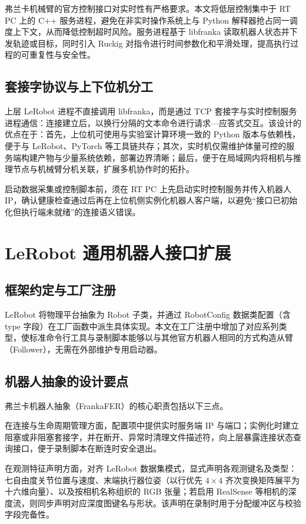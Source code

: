 弗兰卡机械臂的官方控制接口对实时性有严格要求。本文将低层控制集中于 RT PC 上的 C++ 服务进程，避免在非实时操作系统上与 Python 解释器抢占同一调度上下文，从而降低控制超时风险。服务进程基于 libfranka 读取机器人状态并下发轨迹或目标，同时引入 Ruckig 对指令进行时间参数化和平滑处理，提高执行过程的可重复性与安全性。

\subsection{套接字协议与上下位机分工}

上层 LeRobot 进程不直接调用 libfranka，而是通过 TCP 套接字与实时控制服务进程通信：连接建立后，以换行分隔的文本命令进行请求—应答式交互。该设计的优点在于：首先，上位机可使用与实验室计算环境一致的 Python 版本与依赖栈，便于与 LeRobot、PyTorch 等工具链共存；其次，实时机仅需维护体量可控的服务端构建产物与少量系统依赖，部署边界清晰；最后，便于在局域网内将相机与推理节点与机械臂分机关联，扩展多机协作时的拓扑。

启动数据采集或控制脚本前，须在 RT PC 上先启动实时控制服务并传入机器人 IP，确认健康检查通过后再在上位机侧实例化机器人客户端，以避免“接口已初始化但执行端未就绪”的连接语义错误。

\section{LeRobot 通用机器人接口扩展}
\label{sec:lerobot-robot}

\subsection{框架约定与工厂注册}

LeRobot 将物理平台抽象为 Robot 子类，并通过 RobotConfig 数据类配置（含 type 字段）在工厂函数中派生具体实现。本文在工厂注册中增加了对应系列类型，使标准命令行工具与录制脚本能够以与其他官方机器人相同的方式构造从臂（Follower），无需在外部维护专用启动器。

\subsection{机器人抽象的设计要点}

弗兰卡机器人抽象（FrankaFER）的核心职责包括以下三点。

在连接与生命周期管理方面，配置项中提供实时服务端 IP 与端口；实例化时建立阻塞或非阻塞套接字，并在断开、异常时清理文件描述符，向上层暴露连接状态查询接口，便于录制脚本在断连时安全退出。

在观测特征声明方面，对齐 LeRobot 数据集模式，显式声明各观测键名及类型：七自由度关节位置与速度、末端执行器位姿（以行优先 $4\times4$ 齐次变换矩阵展平为十六维向量）、以及按相机名称组织的 RGB 张量；若启用 RealSense 等相机的深度流，则同步声明对应深度图键名与形状。该声明在录制时用于分配缓冲区与校验字段完备性。

